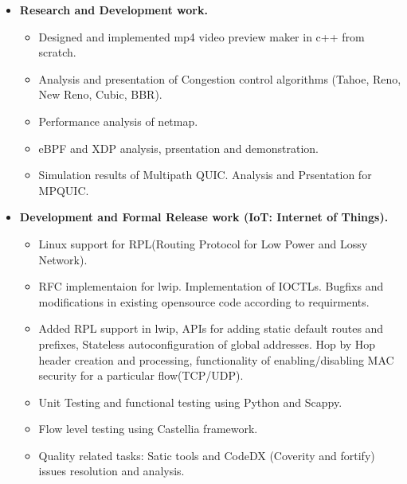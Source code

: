 \begin{itemize}
	\item \textbf{Research and Development work.}\\[-0.6cm]
	\begin{itemize}  	
		\item Designed and implemented mp4 video preview maker in c++ from scratch. \\[-0.5cm]
		\item Analysis and presentation of Congestion control algorithms (Tahoe, Reno, New Reno, Cubic, BBR).\\[-0.5cm]
		\item Performance analysis of netmap.\\[-0.5cm]
		\item eBPF and XDP analysis, prsentation and demonstration.\\[-0.5cm] 
		\item Simulation results of Multipath QUIC. Analysis and Prsentation for MPQUIC.\\[-0.5cm]
	\end{itemize}
	\item \textbf{Development and Formal Release work (IoT: Internet of Things).} \\[-0.6cm]
	\begin{itemize} 
	 \item Linux support for RPL(Routing Protocol for Low Power and Lossy Network).\\[-0.5cm]
	 \item RFC implementaion for lwip. Implementation of IOCTLs. Bugfixs and modifications in existing opensource code according to requirments.\\[-0.5cm]
	 \item Added RPL support in lwip, APIs for adding static default routes and prefixes, Stateless autoconfiguration of global addresses. Hop by Hop header creation and processing, functionality of enabling/disabling MAC security for a particular flow(TCP/UDP).\\[-0.5cm]
	 \item Unit Testing and functional testing using Python and Scappy.\\[-0.5cm]
	 \item Flow level testing using Castellia framework.\\[-0.5cm]
	 \item Quality related tasks: Satic tools and CodeDX (Coverity and fortify) issues resolution and analysis.\\[-0.5cm]
	\end{itemize}
\end{itemize}
